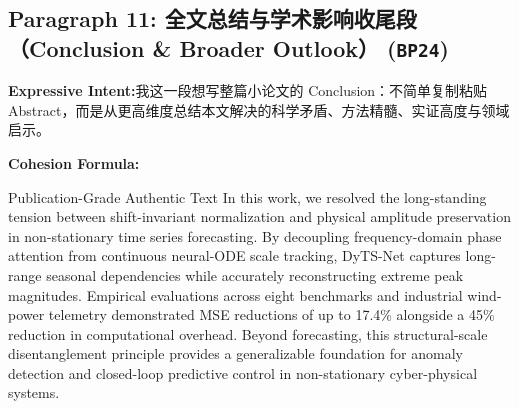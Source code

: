 \subsection*{Paragraph 11: 全文总结与学术影响收尾段（Conclusion \& Broader Outlook） (\texttt{BP24})}
\noindent\textbf{Expressive Intent:}\enspace 我这一段想写整篇小论文的 Conclusion：不简单复制粘贴 Abstract，而是从更高维度总结本文解决的科学矛盾、方法精髓、实证高度与领域启示。\par
\noindent\textbf{Cohesion Formula:}\par\vspace{4pt}
\begin{ExampleBox}{Publication-Grade Authentic Text}
In this work, we resolved the long-standing tension between shift-invariant normalization and physical amplitude preservation in non-stationary time series forecasting. By decoupling frequency-domain phase attention from continuous neural-ODE scale tracking, DyTS-Net captures long-range seasonal dependencies while accurately reconstructing extreme peak magnitudes. Empirical evaluations across eight benchmarks and industrial wind-power telemetry demonstrated MSE reductions of up to 17.4\% alongside a 45\% reduction in computational overhead. Beyond forecasting, this structural-scale disentanglement principle provides a generalizable foundation for anomaly detection and closed-loop predictive control in non-stationary cyber-physical systems.
\end{ExampleBox}
